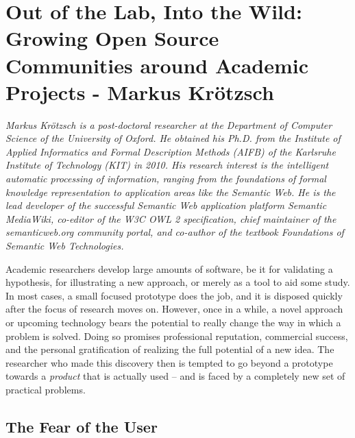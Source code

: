 \chapter{Out of the Lab, Into the Wild: Growing Open Source Communities around
Academic Projects - Markus Kr\"{o}tzsch}


\textit{Markus Kr\"otzsch is a post-doctoral researcher at the Department of
Computer Science of the University of Oxford. He obtained his Ph.D. from the
Institute of Applied Informatics and Formal Description Methods (AIFB) of the
Karlsruhe Institute of Technology (KIT) in 2010. His research interest is the
intelligent automatic processing of information, ranging from the foundations of
formal knowledge representation to application areas like the Semantic Web. He
is the lead developer of the successful Semantic Web application platform
Semantic MediaWiki, co-editor of the W3C OWL 2 specification, chief maintainer
of the semanticweb.org community portal, and co-author of the textbook
Foundations of Semantic Web Technologies.}

Academic researchers develop large amounts of software, be it for validating a
hypothesis, for illustrating a new approach, or merely as a tool to aid some
study. In most cases, a small focused prototype does the job, and it is
disposed quickly after the focus of research moves on. However, once in a while,
a novel approach or upcoming technology bears the potential to really change the
way in which a problem is solved. Doing so promises professional reputation,
commercial success, and the personal gratification of realizing the full
potential of a new idea. The researcher who made this discovery then is tempted
to go beyond a prototype towards a \emph{product} that is actually used -- and
is faced by a completely new set of practical problems.

\section*{The Fear of the User}

